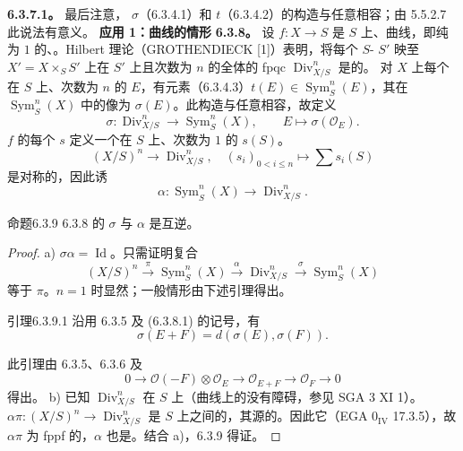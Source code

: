 \textbf{6.3.7.1。} 最后注意， $\sigma$（6.3.4.1）和 $t$（6.3.4.2）的构造与任意相容；由 5.5.2.7 此说法有意义。
\textbf{应用 1：曲线的情形}
\textbf{6.3.8。} 设 $f:X\to S$ 是 $S$ 上、曲线，即纯为 $1$ 的、。Hilbert 理论（GROTHENDIECK [1]）表明，将每个 $S$- $S'$ 映至 $X'=X\times_S S'$ 上在 $S'$ 上且次数为 $n$ 的全体的 fpqc  $\operatorname{Div}_{X/S}^n$ 是的。
对 $X$ 上每个在 $S$ 上、次数为 $n$ 的 $E$，有元素（6.3.4.3）$t(E)\in\operatorname{Sym}_S^n(E)$，其在 $\operatorname{Sym}_S^n(X)$ 中的像为 $\sigma(E)$。此构造与任意相容，故定义
\[\sigma:\operatorname{Div}_{X/S}^n\longrightarrow\operatorname{Sym}_S^n(X),\qquad E\longmapsto\sigma(\mathcal O_E).\tag{6.3.8.1}\]
$f$ 的每个 $s$ 定义一个在 $S$ 上、次数为 $1$ 的 $s(S)$。
\[(X/S)^n\longrightarrow\operatorname{Div}_{X/S}^n,\quad(s_i)_{0<i\le n}\longmapsto\sum s_i(S)\]
是对称的，因此诱
\[\alpha:\operatorname{Sym}_S^n(X)\longrightarrow\operatorname{Div}_{X/S}^n.\tag{6.3.8.2}\]
\begin{SGAresult}{命题}{6.3.9}
6.3.8 的 $\sigma$ 与 $\alpha$ 是互逆。
\end{SGAresult}
\begin{proof}
a) $\sigma\alpha=\operatorname{Id}$。只需证明复合
\[(X/S)^n\xrightarrow{\pi}\operatorname{Sym}_S^n(X)\xrightarrow{\alpha}\operatorname{Div}_{X/S}^n\xrightarrow{\sigma}\operatorname{Sym}_S^n(X)\]
等于 $\pi$。$n=1$ 时显然；一般情形由下述引理得出。
\begin{SGAresult}{引理}{6.3.9.1}
沿用 6.3.5 及 (6.3.8.1) 的记号，有
\[\sigma(E+F)=d(\sigma(E),\sigma(F)).\]
\end{SGAresult}
此引理由 6.3.5、6.3.6 及
\[0\longrightarrow\mathcal O(-F)\otimes\mathcal O_E\longrightarrow\mathcal O_{E+F}\longrightarrow\mathcal O_F\longrightarrow0\]
得出。
b) 已知 $\operatorname{Div}_{X/S}^n$ 在 $S$ 上（曲线上的没有障碍，参见 SGA 3 XI 1）。 $\alpha\pi:(X/S)^n\to\operatorname{Div}_{X/S}^n$ 是 $S$ 上之间的，其源的。因此它（EGA $0_{\mathrm{IV}}$ 17.3.5），故 $\alpha\pi$ 为 fppf 的，$\alpha$ 也是。结合 a)，6.3.9 得证。
\end{proof}

